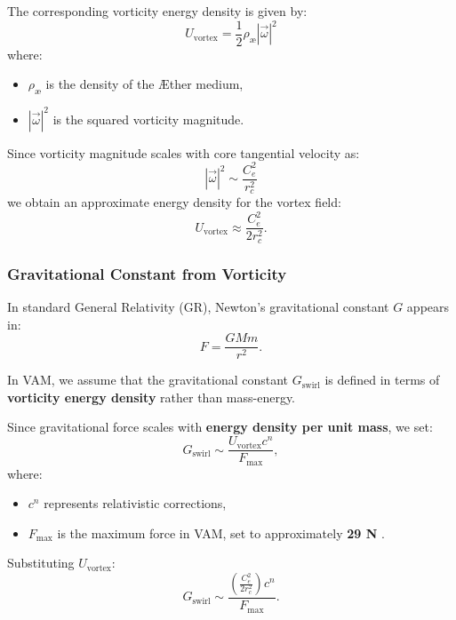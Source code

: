 The corresponding vorticity energy density is given by:
\begin{equation*}
    U_\text{vortex} = \frac{1}{2} \rho_\text{\ae} |\vec{\omega}|^2
\end{equation*}
where:
\begin{itemize}
    \item \( \rho_\text{\ae} \) is the density of the Æther medium,
    \item \( |\vec{\omega}|^2 \) is the squared vorticity magnitude.
\end{itemize}

Since vorticity magnitude scales with core tangential velocity as:
\begin{equation*}
    |\vec{\omega}|^2 \sim \frac{C_e^2}{r_c^2}
\end{equation*}
we obtain an approximate energy density for the vortex field:
\begin{equation*}
    U_\text{vortex} \approx \frac{C_e^2}{2 r_c^2}.
\end{equation*}

\subsubsection*{Gravitational Constant from Vorticity}
In standard General Relativity (GR), Newton's gravitational constant \( G \) appears in:
\begin{equation*}
    F = \frac{GMm}{r^2}.
\end{equation*}

In VAM, we assume that the gravitational constant \(  G_\text{swirl} \) is defined in terms of \textbf{vorticity energy density} rather than mass-energy.

Since gravitational force scales with \textbf{energy density per unit mass}, we set:
\begin{equation*}
    G_\text{swirl} \sim \frac{U_\text{vortex} c^n}{F_{\max}},
\end{equation*}
where:
\begin{itemize}
    \item \( c^n \) represents relativistic corrections,
    \item \( F_{\max} \) is the maximum force in VAM, set to approximately \textbf{29 N} \cite{schiller_max_force}.
\end{itemize}

Substituting \( U_\text{vortex} \):
\begin{equation*}
    G_\text{swirl} \sim \frac{\left( \frac{C_e^2}{2 r_c^2} \right) c^n}{F_{\max}}.
\end{equation*}

